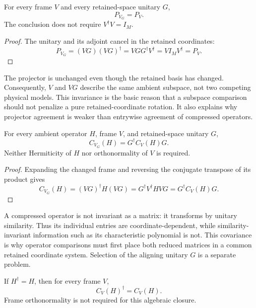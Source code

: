 \begin{theorem}
\label{thm:bg-alignment-004}
For every frame $V$ and every retained-space unitary $G$,
\[
  P_{V_G}=P_V.
\]
The conclusion does not require $V^\dagger V=I_M$.
\end{theorem}

\begin{proof}
The unitary and its adjoint cancel in the retained coordinates:
\[
  P_{V_G}=(VG)(VG)^\dagger
  =VGG^\dagger V^\dagger
  =VI_MV^\dagger
  =P_V.
\]
\end{proof}

The projector is unchanged even though the retained basis has changed. Consequently,
$V$ and $VG$ describe the same ambient subspace, not two competing physical models.
This invariance is the basic reason that a subspace comparison should not penalize a
pure retained-coordinate rotation. It also explains why projector agreement is weaker
than entrywise agreement of compressed operators.

\begin{theorem}
\label{thm:bg-alignment-005}
For every ambient operator $H$, frame $V$, and retained-space unitary $G$,
\[
  C_{V_G}(H)=G^\dagger C_V(H)G.
\]
Neither Hermiticity of $H$ nor orthonormality of $V$ is required.
\end{theorem}

\begin{proof}
Expanding the changed frame and reversing the conjugate transpose of its product gives
\[
  C_{V_G}(H)
  =(VG)^\dagger H(VG)
  =G^\dagger V^\dagger HVG
  =G^\dagger C_V(H)G.
\]
\end{proof}

A compressed operator is not invariant as a matrix: it transforms by unitary
similarity. Thus its individual entries are coordinate-dependent, while similarity-
invariant information such as its characteristic polynomial is not. This covariance is
why operator comparisons must first place both reduced matrices in a common retained
coordinate system. Selection of the aligning unitary $G$ is a separate problem.

\begin{theorem}
\label{thm:bg-alignment-006}
If $H^\dagger=H$, then for every frame $V$,
\[
  C_V(H)^\dagger=C_V(H).
\]
Frame orthonormality is not required for this algebraic closure.
\end{theorem}

